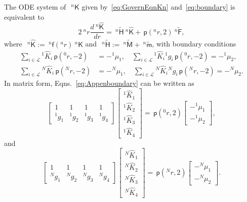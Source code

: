 \documentclass[preprint,10pt,times]{elsarticle}
\numberwithin{equation}{section}
\renewcommand{\u}[1]{\boldsymbol{#1}}
\newcommand{\usf}[1]{\u{\mathsf #1}}
\newcommand{\pr}[1]{\left( #1 \right)}
\newcommand{\p}{\,\mathsf{p}}
\renewcommand{\>}{$\Rightarrow$}
\begin{document}
The ODE system of~$~^{n}{\usf{K}}$ given by~\eqref{eq:GovernEqnKn} and~\eqref{eq:boundary} is equivalent to
\begin{equation}
	2 ~^{n}\!{r} \frac{d~^{n}{\hat{\usf{K}}}}{dr} = ~^{n}\tilde{\usf{H}} ~^{n}{\hat{\usf{K}}} + \p\pr{{}^{n}\!{r},2} ~^{n}\tilde{\usf{F}},
	\label{eq:AppendKendr}
\end{equation}
where~$~^{n}{\hat{\usf{K}}} := ~^{n}\usf{f}({}^{n}\!r)~^{n}{\usf{K}}$ and~$~^{n}\tilde{\usf{H}} := ~^{n}\tilde{\usf{M}} + ~^{n}\tilde{\usf{m}}$, with boundary conditions
\begin{subequations}
	\begin{align}
	\sum_{i \in \mathcal{L}} {}^{1}\!\hat{K}_{i} \p\pr{{}^{0}\!{r},-2} & = -{}^{1}\!{\mu_{1}}, \quad
	 \sum_{i \in \mathcal{L}} {}^{1}\!\hat{K}_{i} {}^{1}\!{g_{i}} \p\pr{{}^{0}\!{r},-2} = -{}^{1}\!{\mu_{2}},\\
	\sum_{i \in \mathcal{L}} {}^{N}\!\hat{K}_{i} \p\pr{{}^{N}\!{r},-2} & = -{}^{N}\!{\mu_{1}}, \quad
	 \sum_{i \in \mathcal{L}} {}^{N}\!\hat{K}_{i} {}^{N}\!{g_{i}} \p\pr{{}^{N}\!{r},-2} = -{}^{N}\!{\mu_{2}}.
	\end{align}
	\label{eq:Appenboundary}
\end{subequations}
In matrix form, Eqns.~\eqref{eq:Appenboundary} can be written as
\begin{equation}
  \begin{bmatrix}
  1 & 1 & 1 & 1 \\
  {}^{1}\!g_1 & {}^{1}\!g_2 & {}^{1}\!g_3 & {}^{1}\!g_4
  \end{bmatrix}
  \begin{bmatrix}
  {}^{1}\!{\hat{K}_{1}} \\ {}^{1}\!{\hat{K}_{2}} \\{}^{1}\!{\hat{K}_{3}} \\{}^{1}\!{\hat{K}_{4}}
  \end{bmatrix}
  = \p\pr{{}^{0}\!{r},2}
  \begin{bmatrix}
  -{}^{1}\!{\mu_{1}} \\ -{}^{1}\!{\mu_{2}}
  \end{bmatrix},
\end{equation}
and
\begin{equation}
  \begin{bmatrix}
  1 & 1 & 1 & 1 \\
  {}^{N}\!g_1 & {}^{N}\!g_2 & {}^{N}\!g_3 & {}^{N}\!g_4
  \end{bmatrix}
  \begin{bmatrix}
  {}^{N}\!{\hat{K}_{1}} \\ {}^{N}\!{\hat{K}_{2}} \\{}^{N}\!{\hat{K}_{3}} \\{}^{N}\!{\hat{K}_{4}}
  \end{bmatrix}
  = \p\pr{{}^{N}\!{r},2}
  \begin{bmatrix}
  -{}^{N}\!{\mu_{1}} \\ -{}^{N}\!{\mu_{2}}
  \end{bmatrix}.
\end{equation}
\end{document}
